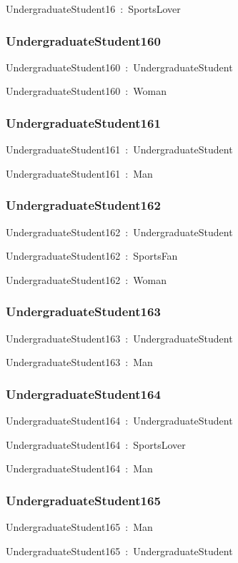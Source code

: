 \documentclass{article}
\begin{document}
UndergraduateStudent16~:~SportsLover

\subsubsection*{UndergraduateStudent160}

UndergraduateStudent160~:~UndergraduateStudent

UndergraduateStudent160~:~Woman

\subsubsection*{UndergraduateStudent161}

UndergraduateStudent161~:~UndergraduateStudent

UndergraduateStudent161~:~Man

\subsubsection*{UndergraduateStudent162}

UndergraduateStudent162~:~UndergraduateStudent

UndergraduateStudent162~:~SportsFan

UndergraduateStudent162~:~Woman

\subsubsection*{UndergraduateStudent163}

UndergraduateStudent163~:~UndergraduateStudent

UndergraduateStudent163~:~Man

\subsubsection*{UndergraduateStudent164}

UndergraduateStudent164~:~UndergraduateStudent

UndergraduateStudent164~:~SportsLover

UndergraduateStudent164~:~Man

\subsubsection*{UndergraduateStudent165}

UndergraduateStudent165~:~Man

UndergraduateStudent165~:~UndergraduateStudent
\end{document}
